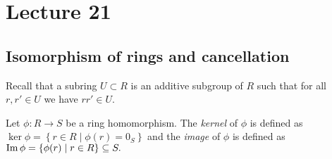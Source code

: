 \section{Lecture 21}
\subsection{Isomorphism of rings and cancellation}

Recall that a subring $U\subset R$ is an additive subgroup of $R$ such that for all
$r,r'\in U$ we have $rr'\in U$. 




\begin{definition}
  Let $\phi:R\to S$ be a ring homomorphism. The \emph{kernel} of $\phi$ is defined as
  $\ker\phi=\left\{ r\in R \mid \phi(r)=0_S \right\}$ and the \emph{image} of $\phi$ is
  defined as $\operatorname{Im}\phi=\left\{ \phi(r) \mid r\in R \right\}\subseteq S.$
\end{definition}


